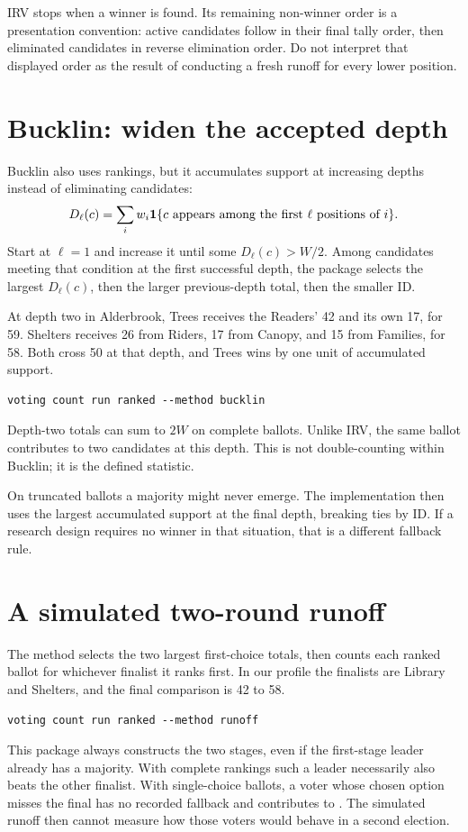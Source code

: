 IRV stops when a winner is found. Its remaining non-winner order is a presentation convention: active candidates follow in their final tally order, then eliminated candidates in reverse elimination order. Do not interpret that displayed order as the result of conducting a fresh runoff for every lower position.

\section{Bucklin: widen the accepted depth}
Bucklin also uses rankings, but it accumulates support at increasing depths instead of eliminating candidates:
\[
D_\ell(c)=\sum_i w_i\mathbf{1}\{c\text{ appears among the first }\ell\text{ positions of }i\}.
\]
Start at $\ell=1$ and increase it until some $D_\ell(c)>W/2$. Among candidates meeting that condition at the first successful depth, the package selects the largest $D_\ell(c)$, then the larger previous-depth total, then the smaller ID.

At depth two in Alderbrook, Trees receives the Readers' 42 and its own 17, for 59. Shelters receives 26 from Riders, 17 from Canopy, and 15 from Families, for 58. Both cross 50 at that depth, and Trees wins by one unit of accumulated support.
\begin{lstlisting}[style=votingrun]
voting count run ranked --method bucklin
\end{lstlisting}
Depth-two totals can sum to $2W$ on complete ballots. Unlike IRV, the same ballot contributes to two candidates at this depth. This is not double-counting within Bucklin; it is the defined statistic.

On truncated ballots a majority might never emerge. The implementation then uses the largest accumulated support at the final depth, breaking ties by ID. If a research design requires no winner in that situation, that is a different fallback rule.

\section{A simulated two-round runoff}
The  method selects the two largest first-choice totals, then counts each ranked ballot for whichever finalist it ranks first. In our profile the finalists are Library and Shelters, and the final comparison is 42 to 58.
\begin{lstlisting}[style=votingrun]
voting count run ranked --method runoff
\end{lstlisting}
This package always constructs the two stages, even if the first-stage leader already has a majority. With complete rankings such a leader necessarily also beats the other finalist. With single-choice ballots, a voter whose chosen option misses the final has no recorded fallback and contributes to . The simulated runoff then cannot measure how those voters would behave in a second election.

